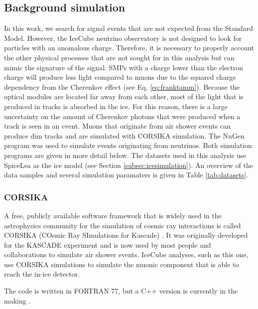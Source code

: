 \subsection{Background simulation}
In this work, we search for signal events that are not expected from the Standard Model. However, the IceCube neutrino observatory is not designed to look for particles with an anomalous charge. Therefore, it is necessary to properly account the other physical processes that are not sought for in this analysis but can mimic the signature of the signal. SMPs with a charge lower than the electron charge will produce less light compared to muons due to the squared charge dependency from the Cherenkov effect (see Eq. \ref{eq:franktamm}). Because the optical modules are located far away from each other, most of the light that is produced in tracks is absorbed in the ice. For this reason, there is a large uncertainty on the amount of Cherenkov photons that were produced when a track is seen in an event. Muons that originate from air shower events can produce dim tracks and are simulated with CORSIKA simulation. The NuGen program was used to simulate events originating from neutrinos. Both simulation programs are given in more detail below. The datasets used in this analysis use SpiceLea as the ice model (see Section \ref{subsec:icesimulation}). An overview of the data samples and several simulation paramaters is given in Table \ref{tab:datasets}.

\subsubsection{CORSIKA}
\label{subsub:corsika}
A free, publicly available software framework that is widely used in the astrophysics community for the simulation of cosmic ray interactions is called CORSIKA  (COsmic Ray SImulations for Kascade) \cite{Heck:1998vt}. It was originally developed for the KASCADE experiment and is now used by most people and collaborations to simulate air shower events. IceCube analyses, such as this one, use CORSIKA simulations to simulate the muonic component that is able to reach the in-ice detector.

The code is written in FORTRAN 77, but a C++ version is currently in the making \cite{Engel:2018akg}.\\

